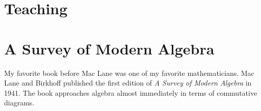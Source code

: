 \section{Teaching}




\section{A Survey of Modern Algebra}

My favorite book before Mac Lane was one of my favorite mathematicians. Mac Lane and Birkhoff published the first edition of \emph{A Survey of Modern Algebra} in 1941. The book approaches algebra almost immediately in terms of commutative diagrams. 